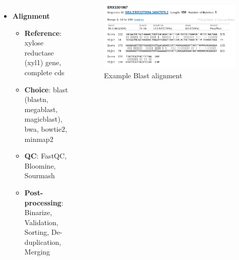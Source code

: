 \documentclass{beamer}
\begin{document}
\begin{frame}[t]
	\begin{columns}
		\begin{itemize}
			\item \textbf{Alignment}
			      \begin{itemize}
			      	\item \textbf{Reference}: xylose reductase (xyl1) gene, complete cds
			      	\item \textbf{Choice}: blast (blastn, megablast, magicblast), bwa, bowtie2, minmap2
			      	\item \textbf{QC}: FastQC, Bloomine, Sourmash
			      	\item \textbf{Post-processing}: Binarize, Validation, Sorting, De-duplication, Merging
			      \end{itemize}
		\end{itemize}
		\begin{figure}
			\centering
			\includegraphics[width=\textwidth,height=0.5\textheight,keepaspectratio]{aln.png}
			\caption{Example Blast alignment}
		\end{figure}
		        
		        
	\end{columns}
	
\end{frame}
\end{document}
